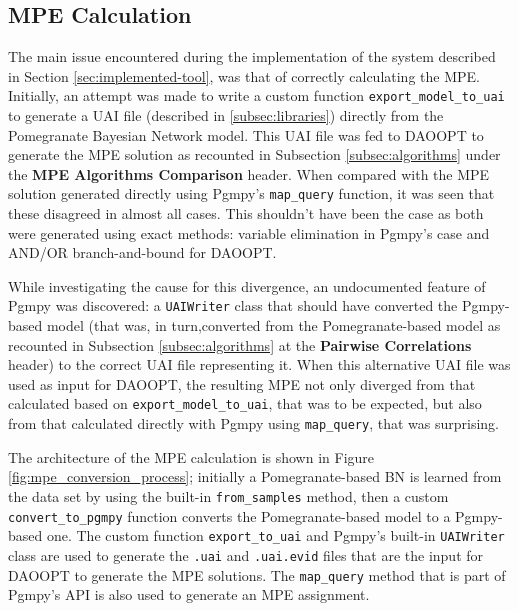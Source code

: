 \subsection{MPE Calculation} \label{subsec:results-mpe-calculation-issues}
The main issue encountered during the implementation of the system described in Section \ref{sec:implemented-tool}, was that of correctly calculating the MPE.
Initially, an attempt was made to write a custom function \texttt{export\_model\_to\_uai} to generate a UAI file (described in \ref{subsec:libraries}) directly from the Pomegranate Bayesian Network model.
This UAI file was fed to DAOOPT to generate the MPE solution as recounted in Subsection \ref{subsec:algorithms} under the \textbf{MPE Algorithms Comparison} header.
When compared with the MPE solution generated directly using Pgmpy's \texttt{map\_query} function, it was seen that these disagreed in almost all cases.
This shouldn't have been the case as both were generated using exact methods: variable elimination in Pgmpy's case and AND/OR branch-and-bound for DAOOPT.

While investigating the cause for this divergence, an undocumented feature of Pgmpy was discovered: a \texttt{UAIWriter} class that should have converted the Pgmpy-based model (that was, in turn,converted from the Pomegranate-based model as recounted in Subsection \ref{subsec:algorithms} at the \textbf{Pairwise Correlations} header) to the correct UAI file representing it.
When this alternative UAI file was used as input for DAOOPT, the resulting MPE not only diverged from that calculated based on \texttt{export\_model\_to\_uai}, that was to be expected, but also from that calculated directly with Pgmpy using \texttt{map\_query}, that was surprising.

The architecture of the MPE calculation is shown in Figure \ref{fig:mpe_conversion_process}; initially a Pomegranate-based BN is learned from the data set by using the built-in \texttt{from\_samples} method, then a custom \texttt{convert\_to\_pgmpy} function converts the Pomegranate-based model to a Pgmpy-based one.
The custom function \texttt{export\_to\_uai} and Pgmpy's built-in \texttt{UAIWriter} class are used to generate the \texttt{.uai} and \texttt{.uai.evid} files that are the input for DAOOPT to generate the MPE solutions.
The \texttt{map\_query} method that is part of Pgmpy's API is also used to generate an MPE assignment.

